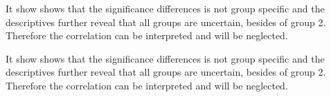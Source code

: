 

It show shows that the significance differences is not group specific and the descriptives further reveal that all groups are uncertain, besides of group 2. Therefore the correlation can be interpreted and will be neglected.

It show shows that the significance differences is not group specific and the descriptives further reveal that all groups are uncertain, besides of group 2. Therefore the correlation can be interpreted and will be neglected.




